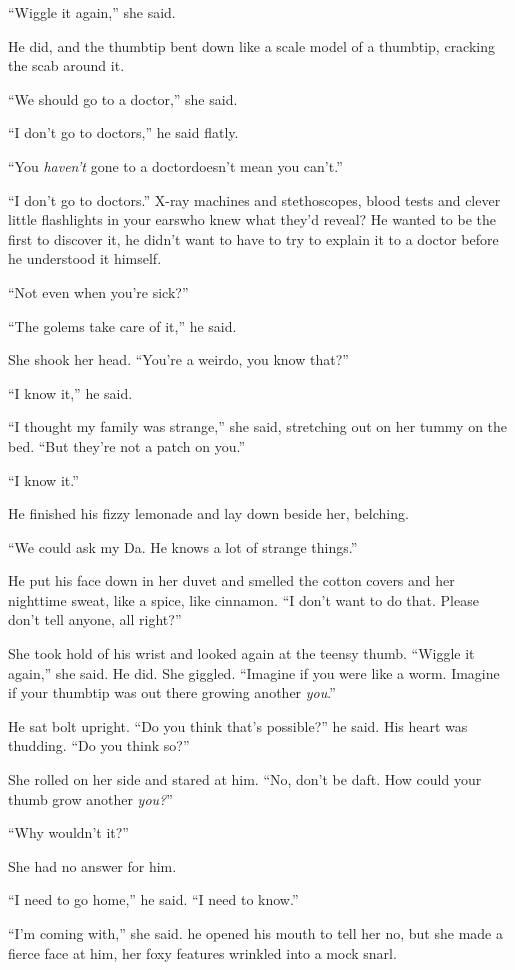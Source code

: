 ``Wiggle it again,'' she said.

He did, and the thumbtip bent down like a scale model of a thumbtip,
cracking the scab around it.

``We should go to a doctor,'' she said.

``I don't go to doctors,'' he said flatly.

``You \textit{haven't} gone to a doctor\dash{}doesn't mean you can't.''

``I don't go to doctors.'' X-ray machines and stethoscopes, blood
tests and clever little flashlights in your ears\dash{}who knew what
they'd reveal?  He wanted to be the first to discover it, he didn't
want to have to try to explain it to a doctor before he understood it
himself.

``Not even when you're sick?''

``The golems take care of it,'' he said.

She shook her head.  ``You're a weirdo, you know that?''

``I know it,'' he said.

``I thought my family was strange,'' she said, stretching out on her
tummy on the bed.  ``But they're not a patch on you.''

``I know it.''

He finished his fizzy lemonade and lay down beside her, belching.

``We could ask my Da.  He knows a lot of strange things.''

He put his face down in her duvet and smelled the cotton covers and
her nighttime sweat, like a spice, like cinnamon.  ``I don't want to
do that.  Please don't tell anyone, all right?''

She took hold of his wrist and looked again at the teensy thumb. 
``Wiggle it again,'' she said.  He did.  She giggled.  ``Imagine if
you were like a worm.  Imagine if your thumbtip was out there growing
another \textit{you}.''

He sat bolt upright.  ``Do you think that's possible?'' he said.  His
heart was thudding.  ``Do you think so?''

She rolled on her side and stared at him.  ``No, don't be daft.  How
could your thumb grow another \textit{you?}''

``Why wouldn't it?''

She had no answer for him.

``I need to go home,'' he said.  ``I need to know.''

``I'm coming with,'' she said.  he opened his mouth to tell her no,
but she made a fierce face at him, her foxy features wrinkled into a
mock snarl.


